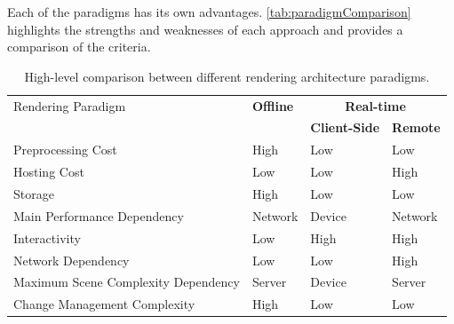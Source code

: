 Each of the paradigms has its own advantages. \autoref{tab:paradigmComparison} highlights the strengths and weaknesses of each approach and provides a comparison of the criteria.

\begin{table}[H]
  \centering
  \begin{tabular}{@{}p{5cm}p{2.5cm}p{2.5cm}p{2.5cm}@{}}
    \toprule
    Rendering Paradigm                           & \textbf{Offline} & \multicolumn{2}{c}{\textbf{Real-time}}                   \\
                                                 &                  & \textbf{Client-Side}                   & \textbf{Remote} \\
    Preprocessing Cost                           & High             & Low                                    & Low             \\
    Hosting Cost                                 & Low              & Low                                    & High            \\
    Storage                                      & High             & Low                                    & Low             \\
    Main Performance \newline Dependency         & Network          & Device                                 & Network         \\
    Interactivity                                & Low              & High                                   & High            \\
    Network Dependency                           & Low              & Low                                    & High            \\
    Maximum Scene \newline Complexity Dependency & Server           & Device                                 & Server          \\
    Change Management \newline Complexity        & High             & Low                                    & Low             \\
    \bottomrule
  \end{tabular}
  \caption{High-level comparison between different rendering architecture paradigms.}
  \label{tab:paradigmComparison}
\end{table}

